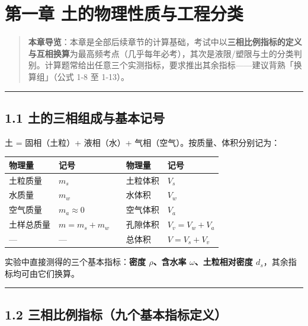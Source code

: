\documentclass[
]{article}
\author{}
\date{}
\newcounter{none} %
\begin{document}
\section{第一章
土的物理性质与工程分类}\label{ux7b2cux4e00ux7ae0-ux571fux7684ux7269ux7406ux6027ux8d28ux4e0eux5de5ux7a0bux5206ux7c7b}

\begin{quote}
\textbf{本章导览}：本章是全部后续章节的计算基础，考试中以\textbf{三相比例指标的定义与互相换算}为最高频考点（几乎每年必考），其次是液限/塑限与土的分类判别。计算题常给出任意三个实测指标，要求推出其余指标------建议背熟「换算组」（公式
1-8 至 1-13）。
\end{quote}

\begin{center}\rule{0.5\linewidth}{0.5pt}\end{center}

\subsection{1.1
土的三相组成与基本记号}\label{ux571fux7684ux4e09ux76f8ux7ec4ux6210ux4e0eux57faux672cux8bb0ux53f7}

土 = 固相（土粒）+ 液相（水）+ 气相（空气）。按质量、体积分别记为：

{\def\LTcaptype{none} %
\begin{longtable}[]{@{}lllll@{}}
\toprule\noalign{}
物理量 & 记号 & & 物理量 & 记号 \\
\midrule\noalign{}
\endhead
\bottomrule\noalign{}
\endlastfoot
土粒质量 & \(m_s\) & & 土粒体积 & \(V_s\) \\
水质量 & \(m_w\) & & 水体积 & \(V_w\) \\
空气质量 & \(m_a\approx0\) & & 空气体积 & \(V_a\) \\
土样总质量 & \(m=m_s+m_w\) & & 孔隙体积 & \(V_v=V_w+V_a\) \\
--- & --- & & 总体积 & \(V=V_s+V_v\) \\
\end{longtable}
}

实验中直接测得的三个基本指标：\textbf{密度 \(\rho\)、含水率
\(\omega\)、土粒相对密度 \(d_s\)}，其余指标均可由它们换算。

\begin{center}\rule{0.5\linewidth}{0.5pt}\end{center}

\subsection{1.2
三相比例指标（九个基本指标定义）}\label{ux4e09ux76f8ux6bd4ux4f8bux6307ux6807ux4e5dux4e2aux57faux672cux6307ux6807ux5b9aux4e49}
\end{document}
